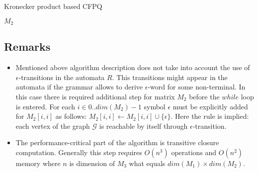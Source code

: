 \begin{algorithm}
\begin{algorithmic}[1]
\caption{Kronecker product based CFPQ}
\label{tensor:cfpq}
                    \EndIf
                \EndIf
           \EndFor
        \EndFor
    \EndWhile
\State \Return $M_2$
\EndFunction
\end{algorithmic}
\end{algorithm}

\subsection{Remarks}
\label{section:remarks}


\begin{itemize}
    \item Mentioned above algorithm description does not take into account the use of $\epsilon$-transitions in the automata $R$. This transitions might appear in the automata if the grammar allows to derive $\epsilon$-word for some non-terminal. In this case there is required additional step for matrix $M_2$ before the $while$ loop is entered. For each $i \in 0..dim(M_2)-1$ symbol $\epsilon$ must be explicitly added for $M_2[i,i]$ as follows: $M_2[i,i] \gets M_2[i,i] \cup \{\epsilon\}$. Here the rule is implied: each vertex of the graph $\mathcal{G}$ is reachable by itself through $\epsilon$-transition. 
    \item The performance-critical part of the algorithm is transitive closure computation. Generally this step requires $O(n^{3})$ operations and $O(n^{2})$ memory where $n$ is dimension of $M_3$ what equals $dim(M_1) \times dim(M_2)$.
\end{itemize}{}

